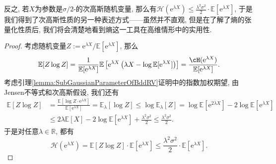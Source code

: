 \begin{remark}
	反之, 若$X$为参数是$\sigma/2$-的次高斯随机变量, 那么有$\mathcal{H}(\mathrm{e}^{\lambda X}) \leq \frac{\lambda^2 \sigma^2}{2} \cdot \mathbb{E}[\mathrm{e}^{\lambda X}]$, 于是我们得到了次高斯性质的另一种表述方式——虽然并不直观, 但是在了解了熵的张量化性质后, 我们将会清楚地看到熵这一工具在高维情形中的实用性. 
	\begin{proof}
		考虑随机变量$Z := \mathrm{e}^{\lambda X} / \mathbb{E}[\mathrm{e}^{\lambda X}]$, 那么
		\begin{equation*}
			\mathbb{E}[Z \log Z] 
			= \frac{1}{\mathbb{E}[\mathrm{e}^{\lambda X}]} \mathbb{E} \left[ \mathrm{e}^{\lambda X} \left(\lambda X - \log \mathbb{E}[\mathrm{e}^{\lambda X}] \right) \right]
			= \frac{\cH(\mathrm{e}^{\lambda X})}{\mathbb{E}[\mathrm{e}^{\lambda X}]}. 
		\end{equation*}
		考虑引理\ref{lemma:SubGaussianParameterOfBddRV}证明中的指数加权期望, 由Jensen不等式和次高斯假设, 我们还有
		\begin{align*}
			\mathbb{E}[Z \log Z]
			&= \frac{\mathbb{E}[\log Z \cdot \mathrm{e}^{\lambda X}]}{\mathbb{E}[\mathrm{e}^{\lambda X}]}
			= \mathbb{E}_{\lambda}[\log Z]
			\leq \log \mathbb{E}_{\lambda} [Z]
			= \log \mathbb{E}[\mathrm{e}^{2\lambda X}] - 2 \log \mathbb{E}[\mathrm{e}^{\lambda X}] \\
			&\leq 2\lambda \mathbb{E}[X] - 2 \log \mathbb{E}[\mathrm{e}^{\lambda X}] + \frac{\lambda^2 \sigma^2}{2}
			\leq \frac{\lambda^2 \sigma^2}{2}. 
		\end{align*}
		于是对任意$\lambda \in \mathbb{R}$, 都有
		\begin{equation*}
			\mathcal{H}(\mathrm{e}^{\lambda X})
			= \mathbb{E}[Z \log Z] \cdot \mathbb{E}[\mathrm{e}^{\lambda X}]
			\leq \frac{\lambda^2 \sigma^2}{2} \cdot \mathbb{E}[\mathrm{e}^{\lambda X}]. 
		\end{equation*}
	\end{proof}
\end{remark}

